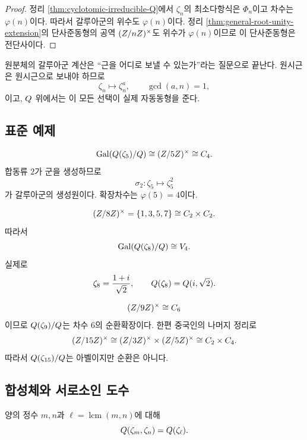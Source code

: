 \begin{proof}
정리 \ref{thm:cyclotomic-irreducible-Q}에서 $\zeta_n$의 최소다항식은 $\Phi_n$이고 차수는 $\varphi(n)$이다. 따라서 갈루아군의 위수도 $\varphi(n)$이다. 정리 \ref{thm:general-root-unity-extension}의 단사준동형의 공역 $(Z/nZ)^\times$도 위수가 $\varphi(n)$이므로 이 단사준동형은 전단사이다.
\end{proof}

\begin{keyidea}
원분체의 갈루아군 계산은 ``근을 어디로 보낼 수 있는가''라는 질문으로 끝난다. 원시근은 원시근으로 보내야 하므로
\[
  \zeta_n\mapsto\zeta_n^a,
  \qquad\gcd(a,n)=1,
\]
이고, $Q$ 위에서는 이 모든 선택이 실제 자동동형을 준다.
\end{keyidea}

\subsection{표준 예제}

\begin{example}[$5$차 원분체]
\[
  \operatorname{Gal}(Q(\zeta_5)/Q)
  \cong(Z/5Z)^\times\cong C_4.
\]
합동류 $2$가 군을 생성하므로
\[
  \sigma_2:\zeta_5\longmapsto\zeta_5^2
\]
가 갈루아군의 생성원이다. 확장차수는 $\varphi(5)=4$이다.
\end{example}

\begin{example}[$8$차 원분체]
\[
  (Z/8Z)^\times=\{1,3,5,7\}
  \cong C_2\times C_2.
\]
따라서
\[
  \operatorname{Gal}(Q(\zeta_8)/Q)\cong V_4.
\]
실제로
\[
  \zeta_8=\frac{1+i}{\sqrt2},
  \qquad
  Q(\zeta_8)=Q(i,\sqrt2).
\]
\end{example}

\begin{example}[$9$차와 $15$차 원분체]
\[
  (Z/9Z)^\times\cong C_6
\]
이므로 $Q(\zeta_9)/Q$는 차수 $6$의 순환확장이다. 한편 중국인의 나머지 정리로
\[
  (Z/15Z)^\times
  \cong(Z/3Z)^\times\times(Z/5Z)^\times
  \cong C_2\times C_4.
\]
따라서 $Q(\zeta_{15})/Q$는 아벨이지만 순환은 아니다.
\end{example}

\subsection{합성체와 서로소인 도수}

\begin{proposition}[원분체의 합성]
\label{prop:cyclotomic-compositum}
양의 정수 $m,n$과 $\ell=\operatorname{lcm}(m,n)$에 대해
\[
  Q(\zeta_m,\zeta_n)=Q(\zeta_\ell).
\]
\end{proposition}

